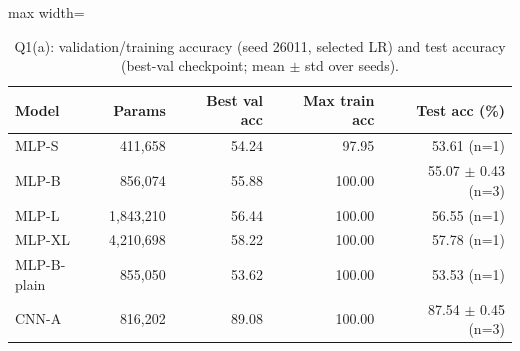 \begin{table}[!tbp]\centering\footnotesize\setlength{\tabcolsep}{3pt}
\begin{adjustbox}{max width=\columnwidth}
\begin{tabular}{lrrrr}\toprule
Model & Params & Best val acc & Max train acc & Test acc (\%) \\\midrule
MLP-S & 411,658 & 54.24 & 97.95 & 53.61 (n=1) \\
MLP-B & 856,074 & 55.88 & 100.00 & 55.07 $\pm$ 0.43 (n=3) \\
MLP-L & 1,843,210 & 56.44 & 100.00 & 56.55 (n=1) \\
MLP-XL & 4,210,698 & 58.22 & 100.00 & 57.78 (n=1) \\
MLP-B-plain & 855,050 & 53.62 & 100.00 & 53.53 (n=1) \\
CNN-A & 816,202 & 89.08 & 100.00 & 87.54 $\pm$ 0.45 (n=3) \\
\bottomrule\end{tabular}
\end{adjustbox}
\caption{Q1(a): validation/training accuracy (seed 26011, selected LR) and test accuracy (best-val checkpoint; mean $\pm$ std over seeds).}\label{tab:q1a}\end{table}
